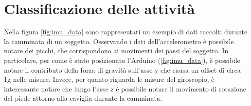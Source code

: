 \clearpage

\section{Classificazione delle attività} \label{classifSect}
Nella figura \ref{fig:imu_data} sono rappresentati un esempio di dati raccolti durante la camminata di un soggetto. Osservando i dati dell'accelerometro è possibile notare dei picchi, che corrispondono ai movimenti dei passi del soggetto. In particolare, per come è stato posizionato l'Arduino (\Fig\ref{fig:imu_data}), è possibile notare il contributo della forza di gravità sull'asse y che causa un offset di circa 1g nelle misure. Invece, per quanto riguarda le misure del giroscopio, è interessante notare che lungo l'asse z è possibile notare il movimento di rotazione del piede attorno alla caviglia durante la camminata. 

